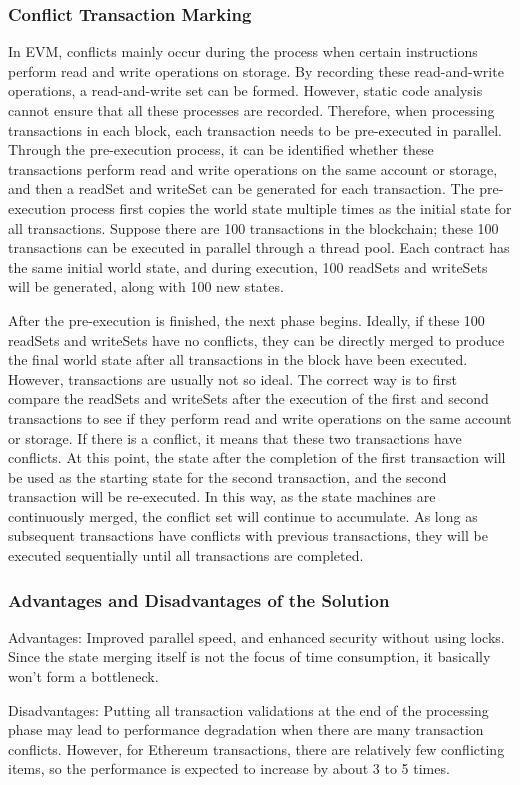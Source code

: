 \subsubsection{Conflict Transaction Marking}

In EVM, conflicts mainly occur during the process when certain instructions perform read and write operations on storage. By recording these read-and-write operations, a read-and-write set can be formed. However, static code analysis cannot ensure that all these processes are recorded. Therefore, when processing transactions in each block, each transaction needs to be pre-executed in parallel. Through the pre-execution process, it can be identified whether these transactions perform read and write operations on the same account or storage, and then a readSet and writeSet can be generated for each transaction. The pre-execution process first copies the world state multiple times as the initial state for all transactions. Suppose there are 100 transactions in the blockchain; these 100 transactions can be executed in parallel through a thread pool. Each contract has the same initial world state, and during execution, 100 readSets and writeSets will be generated, along with 100 new states.

After the pre-execution is finished, the next phase begins. Ideally, if these 100 readSets and writeSets have no conflicts, they can be directly merged to produce the final world state after all transactions in the block have been executed. However, transactions are usually not so ideal. The correct way is to first compare the readSets and writeSets after the execution of the first and second transactions to see if they perform read and write operations on the same account or storage. If there is a conflict, it means that these two transactions have conflicts. At this point, the state after the completion of the first transaction will be used as the starting state for the second transaction, and the second transaction will be re-executed. In this way, as the state machines are continuously merged, the conflict set will continue to accumulate. As long as subsequent transactions have conflicts with previous transactions, they will be executed sequentially until all transactions are completed.

\subsubsection{Advantages and Disadvantages of the Solution}

Advantages: Improved parallel speed, and enhanced security without using locks. Since the state merging itself is not the focus of time consumption, it basically won't form a bottleneck.

Disadvantages: Putting all transaction validations at the end of the processing phase may lead to performance degradation when there are many transaction conflicts. However, for Ethereum transactions, there are relatively few conflicting items, so the performance is expected to increase by about 3 to 5 times.
